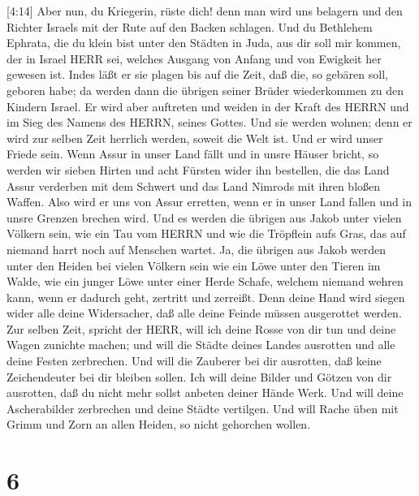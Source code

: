  {[}4:14{]} Aber nun, du Kriegerin, rüste dich! denn man
wird uns belagern und den Richter Israels mit der Rute auf den Backen
schlagen.  Und du Bethlehem Ephrata, die du klein bist unter
den Städten in Juda, aus dir soll mir kommen, der in Israel HERR sei,
welches Ausgang von Anfang und von Ewigkeit her gewesen ist.
 Indes läßt er sie plagen bis auf die Zeit, daß die, so
gebären soll, geboren habe; da werden dann die übrigen seiner Brüder
wiederkommen zu den Kindern Israel.  Er wird aber auftreten
und weiden in der Kraft des HERRN und im Sieg des Namens des HERRN,
seines Gottes. Und sie werden wohnen; denn er wird zur selben Zeit
herrlich werden, soweit die Welt ist.  Und er wird unser
Friede sein. Wenn Assur in unser Land fällt und in unsre Häuser bricht,
so werden wir sieben Hirten und acht Fürsten wider ihn bestellen,
 die das Land Assur verderben mit dem Schwert und das Land
Nimrods mit ihren bloßen Waffen. Also wird er uns von Assur erretten,
wenn er in unser Land fallen und in unsre Grenzen brechen wird.
 Und es werden die übrigen aus Jakob unter vielen Völkern
sein, wie ein Tau vom HERRN und wie die Tröpflein aufs Gras, das auf
niemand harrt noch auf Menschen wartet.  Ja, die übrigen aus
Jakob werden unter den Heiden bei vielen Völkern sein wie ein Löwe unter
den Tieren im Walde, wie ein junger Löwe unter einer Herde Schafe,
welchem niemand wehren kann, wenn er dadurch geht, zertritt und
zerreißt.  Denn deine Hand wird siegen wider alle deine
Widersacher, daß alle deine Feinde müssen ausgerottet werden.
 Zur selben Zeit, spricht der HERR, will ich deine Rosse
von dir tun und deine Wagen zunichte machen;  und will die
Städte deines Landes ausrotten und alle deine Festen zerbrechen.
 Und will die Zauberer bei dir ausrotten, daß keine
Zeichendeuter bei dir bleiben sollen.  Ich will deine
Bilder und Götzen von dir ausrotten, daß du nicht mehr sollst anbeten
deiner Hände Werk.  Und will deine Ascherabilder zerbrechen
und deine Städte vertilgen.  Und will Rache üben mit Grimm
und Zorn an allen Heiden, so nicht gehorchen wollen.

\hypertarget{section-5}{%
\section{6}\label{section-5}}

